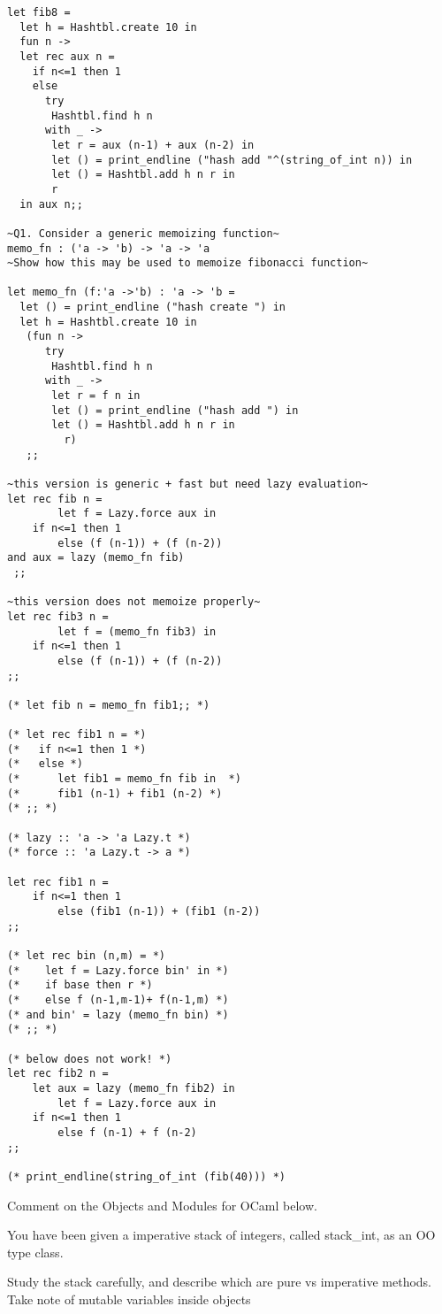 \documentclass[fontsize=10pt]{slnotes}
\begin{document}
\begin{lstlisting}[escapechar=\~,escapebegin=\rmfamily,language={[Objective]Caml}]
let fib8 =
  let h = Hashtbl.create 10 in
  fun n ->
  let rec aux n =
    if n<=1 then 1
    else
      try
       Hashtbl.find h n
      with _ ->
       let r = aux (n-1) + aux (n-2) in
       let () = print_endline ("hash add "^(string_of_int n)) in
       let () = Hashtbl.add h n r in
       r
  in aux n;;

~Q1. Consider a generic memoizing function~
memo_fn : ('a -> 'b) -> 'a -> 'a
~Show how this may be used to memoize fibonacci function~

let memo_fn (f:'a ->'b) : 'a -> 'b =
  let () = print_endline ("hash create ") in
  let h = Hashtbl.create 10 in
   (fun n ->
      try
       Hashtbl.find h n
      with _ ->
       let r = f n in
       let () = print_endline ("hash add ") in
       let () = Hashtbl.add h n r in
         r)
   ;;

~this version is generic + fast but need lazy evaluation~
let rec fib n =
        let f = Lazy.force aux in
	if n<=1 then 1
        else (f (n-1)) + (f (n-2))
and aux = lazy (memo_fn fib)
 ;;

~this version does not memoize properly~
let rec fib3 n =
        let f = (memo_fn fib3) in
	if n<=1 then 1
        else (f (n-1)) + (f (n-2))
;;

(* let fib n = memo_fn fib1;; *)

(* let rec fib1 n = *)
(*   if n<=1 then 1 *)
(*   else *)
(*      let fib1 = memo_fn fib in  *)
(*      fib1 (n-1) + fib1 (n-2) *)
(* ;; *)

(* lazy :: 'a -> 'a Lazy.t *)
(* force :: 'a Lazy.t -> a *)

let rec fib1 n =
	if n<=1 then 1
        else (fib1 (n-1)) + (fib1 (n-2))
;;

(* let rec bin (n,m) = *)
(*    let f = Lazy.force bin' in *)
(*    if base then r *)
(*    else f (n-1,m-1)+ f(n-1,m) *)
(* and bin' = lazy (memo_fn bin) *)
(* ;; *)

(* below does not work! *)
let rec fib2 n =
	let aux = lazy (memo_fn fib2) in
        let f = Lazy.force aux in
	if n<=1 then 1
        else f (n-1) + f (n-2)
;;

(* print_endline(string_of_int (fib(40))) *)
\end{lstlisting}
Comment on the Objects and Modules for OCaml below.

You have been given a imperative stack of integers,
called stack\_int, as an OO type class.

Study the stack carefully, and describe which are
pure vs imperative methods. Take note of mutable
variables inside objects
\end{document}
